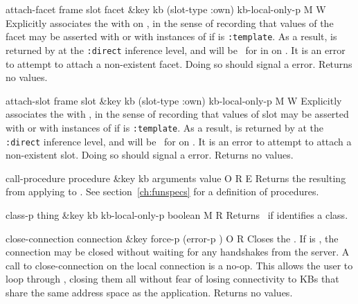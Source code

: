 \begin{okbcop}{attach-facet}{ frame slot facet \&key kb (slot-type :own) kb-local-only-p} { \void } { M } { W } {  }
Explicitly associates the  with  on ,
   in the sense of recording that values of the facet may be asserted with
    or with instances of  if  is
   {\tt :template}.
   As a result,  is returned by  at the
   {\tt :direct} inference level, and  will be
   \true\ for  in  on .  It is an
   error to attempt to attach a non-existent facet.  Doing so should signal
   a  error.  Returns no values.
\end{okbcop}

\begin{okbcop}{attach-slot}{ frame slot \&key kb (slot-type :own) kb-local-only-p} { \void } { M } { W } {  }
Explicitly associates the  with , in the sense
   of recording that values of slot may be asserted with  or
   with instances of  if  is {\tt :template}.
   As a result,  is returned by  at the
   {\tt :direct} inference level, and  will be
   \true\ for  on .  It is an error to attempt to
   attach a non-existent slot.  Doing so should signal a
    error.  Returns no values.
\end{okbcop}

\begin{okbcop}{call-procedure}{ procedure \&key kb arguments} { value } { O } { R } { E }
Returns the  resulting from applying
    to
   .  See section~\ref{ch:funspecs} for a definition of
   procedures.
\end{okbcop}

\begin{okbcop}{class-p}{ thing \&key kb kb-local-only-p} { boolean } { M } { R } {  }
Returns \true\ if  identifies a class.
\end{okbcop}

\begin{okbcop}{close-connection}{ connection \&key force-p (error-p \true)} { \void } { O } { R } {  }
Closes the .  If  is \true, the connection
   may be closed without waiting for any handshakes from the server.  A call
   to close-connection on the local connection
   is a no-op.  This allows the user to loop through ,
   closing them all without fear of losing connectivity to KBs that share the
   same address space as the application.  Returns no values.
\end{okbcop}

